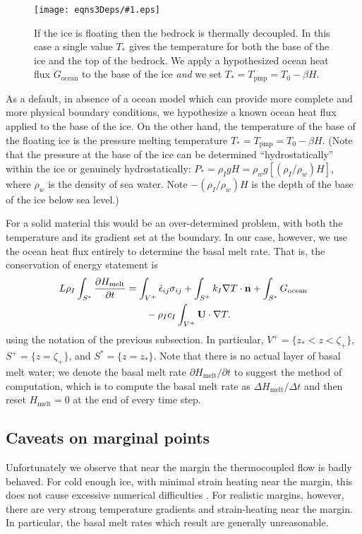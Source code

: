 \documentclass[12pt,final]{amsart}%
\theoremstyle{plain}
\theoremstyle{definition}
\theoremstyle{remark}
\newcommand{\regfigure}[2]{\texttt{[image: eqns3Deps/\#1.eps]}}
\newcommand{\ddt}[1]{\ensuremath{\frac{\partial #1}{\partial t}}}
\def\eps{\epsilon}
\newcommand{\grad}{\nabla}
\newcommand{\nhat}{\mathbf{n}}
\newcommand{\Tpmp}{T_{\text{pmp}}}
\newcommand{\bU}{{\mathbf{U}}}
\begin{document}
\begin{figure}[ht]
\regfigure{floatingcase}{3}
\caption{If the ice is floating then the bedrock is thermally decoupled.  In this case a single value $T_\ast$ gives the temperature for both the base of the ice and the top of the bedrock.  We apply a hypothesized ocean heat flux $G_{\text{ocean}}$ to the base of the ice \emph{and} we set $T_\ast = \Tpmp = T_0 - \beta H$.}
\label{fig:floatingcase}
\end{figure}

As a default, in absence of a ocean model which can provide more complete and more physical boundary conditions, we hypothesize a known ocean heat flux applied to the base of the ice.  On the other hand, the temperature of the base of the floating ice is the pressure melting temperature $T_\ast = \Tpmp = T_0 - \beta H$.  (Note that the pressure at the base of the ice can be determined ``hydrostatically'' within the ice or genuinely hydrostatically: $P_\ast = \rho_I g H = \rho_w g \left[(\rho_I/\rho_w) H\right]$, where $\rho_w$ is the density of sea water.  Note $-(\rho_I/\rho_w) H$ is the depth of the base of the ice below sea level.)

For a solid material this would be an over-determined problem, with both the temperature and its gradient set at the boundary.  In our case, however, we use the ocean heat flux entirely to determine the basal melt rate.  That is, the conservation of energy statement is
\begin{align}
L \rho_I \int_{S^\ast} \ddt{H_{\text{melt}}} &= \int_{V^+} \dot \eps_{ij} \sigma_{ij} + \int_{S^+} k_I \grad T \cdot \nhat + \int_{S^\ast} G_{\text{ocean}} \label{basefloating}\\
    &\qquad - \rho_I c_I\int_{V^+} \bU\cdot \grad T.\notag
\end{align}
using the notation of the previous subsection.  In particular, $V^+ = \{z_\ast < z < \zeta_+\}$, $S^+ = \{z=\zeta_+\}$, and $S^\ast = \{z=z_\ast\}$.  Note that there is no actual layer of basal melt water; we denote the basal melt rate $\partial H_{\text{melt}}/\partial t$ to suggest the method of computation, which is to compute the basal melt rate as $\Delta H_{\text{melt}}/\Delta t$ and then reset $H_{\text{melt}}=0$ at the end of every time step.

\subsection*{Caveats on marginal points}  Unfortunately we observe that near the margin the thermocoupled flow is badly behaved.  For cold enough ice, with minimal strain heating near the margin, this does not cause excessive numerical difficulties \citep{BBL}.  For realistic margins, however, there are very strong temperature gradients and strain-heating near the margin.  In particular, the basal melt rates which result are generally unreasonable.
\end{document}
